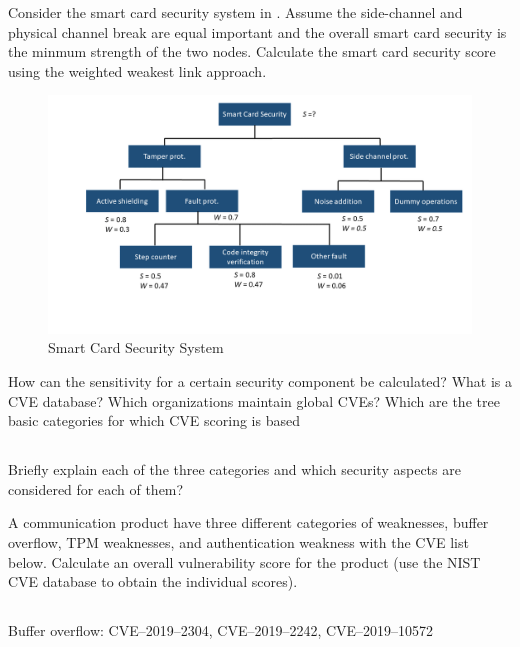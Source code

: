 \begin{questions}
\question{} Consider the smart card security system in .
  Assume the side-channel and physical channel break are equal important and the overall smart card security is the minmum strength of the two nodes.
  Calculate the smart card security score using the weighted weakest link approach.
  \begin{figure}[h!]
    \centering
    \includegraphics[scale=0.35]{./Drawings/EITP20-Secure_Systems_Engineering/Smart_Card_Security_System.png}
    \caption{Smart Card Security System}
    \label{fig:Smart_Card_Security_System}
  \end{figure}


\question{} How can the sensitivity for a certain security component be calculated?
\question{} What is a CVE database? Which organizations maintain global CVEs?
\question{} Which are the tree basic categories for which CVE scoring is based
  \begin{parts}
  \part{} Briefly explain each of the three categories and which security aspects are considered for each of them?
  \end{parts}

\question{} A communication product have three different categories of weaknesses, buffer overflow, TPM weaknesses, and authentication weakness with the CVE list below. Calculate an overall vulnerability score for the product (use the NIST CVE database to obtain the individual scores).
  \begin{parts}
  \part{} Buffer overflow: CVE--2019--2304, CVE--2019--2242, CVE--2019--10572

\end{parts}
\end{questions}
